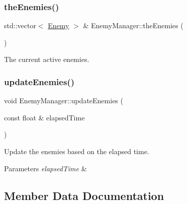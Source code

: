 \mbox{\label{class_enemy_manager_afee94a1383c9ec47a8a8ebb4fa4a2f7b}} 
\subsubsection{\texorpdfstring{the\+Enemies()}{theEnemies()}}
{\footnotesize\ttfamily std\+::vector$<$ \hyperlink{class_enemy}{Enemy} $>$ \& Enemy\+Manager\+::the\+Enemies (\begin{DoxyParamCaption}{ }\end{DoxyParamCaption})}



The current active enemies. 

\mbox{\label{class_enemy_manager_a8a3caf890d121478e41dcc192a8aa4a2}} 
\subsubsection{\texorpdfstring{update\+Enemies()}{updateEnemies()}}
{\footnotesize\ttfamily void Enemy\+Manager\+::update\+Enemies (\begin{DoxyParamCaption}\item[{const float \&}]{elapsed\+Time }\end{DoxyParamCaption})}



Update the enemies based on the elapsed time. 


\begin{DoxyParams}{Parameters}
{\em elapsed\+Time} & \\
\hline
\end{DoxyParams}


\subsection{Member Data Documentation}
\mbox{\label{class_enemy_manager_ab0dfb92601feacf2de9b92c2a11468bf}} 

